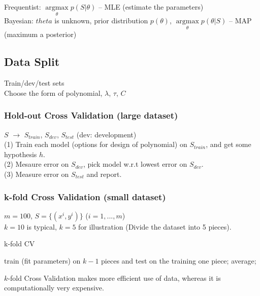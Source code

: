 \documentclass{article}
\begin{document}
\noindent
Frequentist: $\mathop{\arg\max}\limits_{\theta}p(S|\theta)$ -- MLE (estimate the parameters)\\
Bayesian: $theta$ is unknown, prior distribution $p(\theta)$, $\mathop{\arg\max}\limits_{\theta}p(\theta|S)$ -- MAP (maximum a posterior)

\subsection{Data Split}
Train/dev/test sets\\
Choose the form of polynomial, $\lambda$, $\tau$, $C$

\subsubsection{Hold-out Cross Validation (large dataset)}
$S$ $\rightarrow$ $S_{train}$, $S_{dev}$, $S_{test}$ (dev: development)\\
(1) Train each model (options for design of polynomial) on $S_{train}$, and get some hypothesis $h$.\\
(2) Mesaure error on $S_{dev}$, pick model w.r.t lowest error on $S_{dev}$.\\
(3) Measure error on $S_{test}$ and report.

\subsubsection{k-fold Cross Validation (small dataset)}
$m = 100$, $S = \{(x^i,y^i)\}$ ($i=1,...,m$)\\
$k = 10$ is typical, $k = 5$ for illustration (Divide the dataset into 5 pieces).\\
\begin{algorithm}[h]
  \caption{k-fold CV}
\label{alg::conjugateGradient}
\begin{algorithmic}[1]
        \State train (fit parameters) on $k-1$ pieces and test on the training one piece;
    \EndFor
    \State average;
  \EndFor
\end{algorithmic}
\end{algorithm}

\noindent
$k$-fold Cross Validation makes more efficient use of data, whereas it is computationally very expensive.
\end{document}
